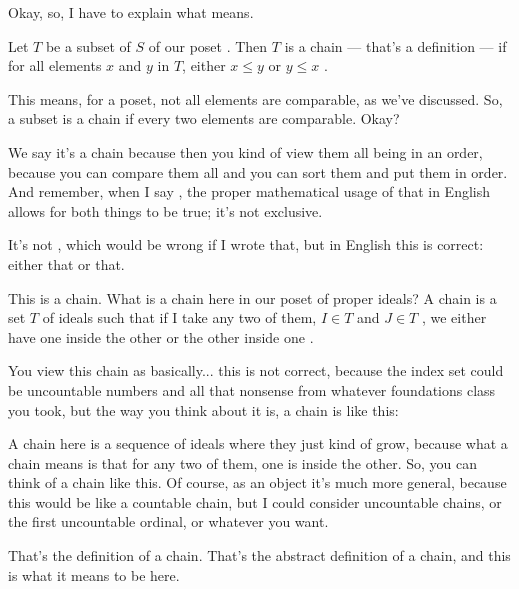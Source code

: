 \begin{speech}[00:38:18 - 00:39:26]
Okay, so, I have to explain what  means.

Let $T$ be a subset of $S$ of our poset . Then $T$ is a chain  --- that's a definition --- if for all elements $x$ and $y$ in $T$, either $x \le y$ or $y \le x$ .

This means, for a poset, not all elements are comparable, as we've discussed. So, a subset is a chain if every two elements are comparable. Okay?

We say it's a chain because then you kind of view them all being in an order, because you can compare them all and you can sort them and put them in order. And remember, when I say , the proper mathematical usage of that in English allows for both things to be true; it's not exclusive.

It's not , which would be wrong if I wrote that, but in English this is correct: either that or that.
\end{speech}

\begin{speech}[00:39:26 - 00:40:43]
This is a chain. What is a chain here in our poset of proper ideals? A chain is a set $T$ of ideals such that if I take any two of them, $I \in T$ and $J \in T$ , we either have one inside the other or the other inside one .

You view this chain as basically... this is not correct, because the index set could be uncountable numbers and all that nonsense from whatever foundations class you took, but the way you think about it is, a chain is like this: 

A chain here is a sequence of ideals where they just kind of grow, because what a chain means is that for any two of them, one is inside the other. So, you can think of a chain like this. Of course, as an object it's much more general, because this would be like a countable chain, but I could consider uncountable chains, or the first uncountable ordinal, or whatever you want.

That's the definition of a chain. That's the abstract definition of a chain, and this is what it means to be here.
\end{speech}

